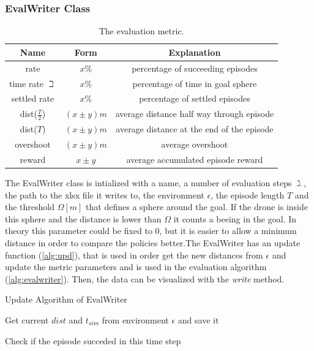 \subsubsection{EvalWriter Class} \label{sec:evalw}
\begin{table}
	\centering
	\caption{The evaluation metric.}\label{tab:evalmetric}
	\begin{tabular}{c|c|c}
		Name & Form & Explanation\\
		\hline
		rate & $x \%$ & percentage of succeeding episodes\\
		time rate $\beth$ & $x\%$ & percentage of time in goal sphere\\
		settled rate & $x\%$ & percentage of settled episodes\\
		dist($\frac{T}{2}$) & $(x \pm y) m $& average distance half way through episode\\
		dist($T$) &  $(x \pm y) m $ & average distance at the end of the episode\\
		overshoot & $(x \pm y) m $ & average overshoot\\
		reward & $x \pm y $ & average accumulated episode reward
	\end{tabular}
\end{table}

The EvalWriter class is intialized with a name, a number of evaluation steps $\gimel$, the path to the xlsx file it writes to, the environment $\epsilon$, the episode length  $T$ and the threshold $\Omega[m]$ that defines a sphere around the goal. If the drone is inside this sphere and the distance is lower than $\Omega$ it counts a beeing in the goal. In theory this parameter could be fixed to 0, but it is easier to allow a minimum distance in order to compare the policies better.The EvalWriter has  an update function (\cref{alg:upd}), that is used in order get the new distances from $\epsilon$ and update the metric parameters and is used in the evaluation algorithm (\cref{alg:evalwriter}). Then, the data can be visualized with the \emph{write} method.

\begin{algorithm}
	\caption{Update Algorithm of EvalWriter}
	\label{alg:upd}
	Get current $dist$ and $t_{sim}$ from environment $\epsilon$ and save it
	
		
		
	
	
	Check if the episode succeded in this time step
\end{algorithm}

